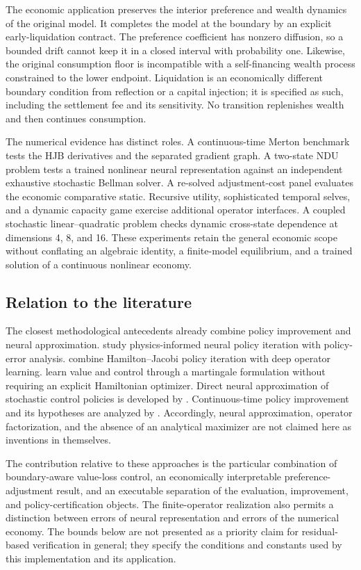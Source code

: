 The economic application preserves the interior preference and wealth dynamics of the original model. It completes the model at the boundary by an explicit early-liquidation contract. The preference coefficient has nonzero diffusion, so a bounded drift cannot keep it in a closed interval with probability one. Likewise, the original consumption floor is incompatible with a self-financing wealth process constrained to the lower endpoint. Liquidation is an economically different boundary condition from reflection or a capital injection; it is specified as such, including the settlement fee and its sensitivity. No transition replenishes wealth and then continues consumption.

The numerical evidence has distinct roles. A continuous-time Merton benchmark tests the HJB derivatives and the separated gradient graph. A two-state NDU problem tests a trained nonlinear neural representation against an independent exhaustive stochastic Bellman solver. A re-solved adjustment-cost panel evaluates the economic comparative static. Recursive utility, sophisticated temporal selves, and a dynamic capacity game exercise additional operator interfaces. A coupled stochastic linear--quadratic problem checks dynamic cross-state dependence at dimensions 4, 8, and 16. These experiments retain the general economic scope without conflating an algebraic identity, a finite-model equilibrium, and a trained solution of a continuous nonlinear economy.

\subsection{Relation to the literature}
The closest methodological antecedents already combine policy improvement and neural approximation. \citet{kim2025} study physics-informed neural policy iteration with policy-error analysis. \citet{lee2024} combine Hamilton--Jacobi policy iteration with deep operator learning. \citet{cai2025} learn value and control through a martingale formulation without requiring an explicit Hamiltonian optimizer. Direct neural approximation of stochastic control policies is developed by \citet{han2016}. Continuous-time policy improvement and its hypotheses are analyzed by \citet{jacka2015}. Accordingly, neural approximation, operator factorization, and the absence of an analytical maximizer are not claimed here as inventions in themselves.

The contribution relative to these approaches is the particular combination of boundary-aware value-loss control, an economically interpretable preference-adjustment result, and an executable separation of the evaluation, improvement, and policy-certification objects. The finite-operator realization also permits a distinction between errors of neural representation and errors of the numerical economy. The bounds below are not presented as a priority claim for residual-based verification in general; they specify the conditions and constants used by this implementation and its application.


